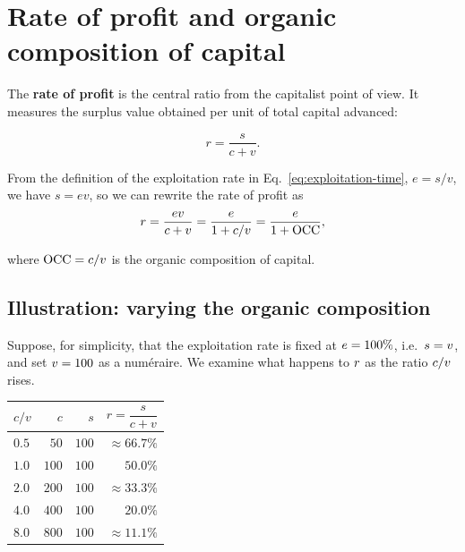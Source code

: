 \section{Rate of profit and organic composition of capital}
\label{sec:rate-profit}

The \textbf{rate of profit} is the central ratio from the capitalist point
of view. It measures the surplus value obtained per unit of total capital
advanced:

\begin{equation}
  r = \frac{s}{c + v}.
  \label{eq:profit-rate-basic}
\end{equation}


From the definition of the exploitation rate in Eq.~\eqref{eq:exploitation-time},
\(e = s/v\), we have \(s = e v\), so we can rewrite the rate of profit as
\begin{equation}
  r = \frac{e v}{c + v}
    = \frac{e}{1 + c/v}
    = \frac{e}{1 + \mathrm{OCC}},
  \label{eq:profit-rate-occ}
\end{equation}

where \(\mathrm{OCC} = c/v\) is the organic composition of capital.



\subsection{Illustration: varying the organic composition}

Suppose, for simplicity, that the exploitation rate is fixed at
$e = 100\%$, i.e.\ $s = v$, and set $v=100$
as a numéraire. We examine what happens to $r$ as the ratio
$c/v$ rises.

\begin{center}
\begin{tabular}{@{}lrrr@{}}
\toprule
$c/v$ & $c$ & $s$ & $r = \dfrac{s}{c+v}$ \\
\midrule
$0.5$ & $50$  & $100$ & $\approx 66.7\%$ \\
$1.0$ & $100$ & $100$ & $50.0\%$        \\
$2.0$ & $200$ & $100$ & $\approx 33.3\%$ \\
$4.0$ & $400$ & $100$ & $20.0\%$        \\
$8.0$ & $800$ & $100$ & $\approx 11.1\%$ \\
\bottomrule
\end{tabular}
\end{center}

